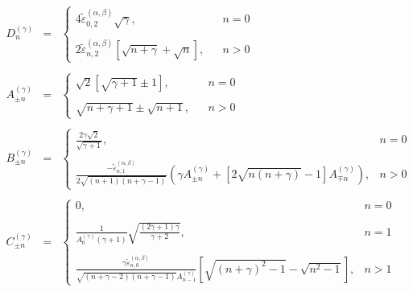 \[ \begin{array}{lll}
     D_n^{(\gamma)} & = & \left\{ \begin{array}{lll}
       4 \tilde{\varepsilon}_{0, 2}^{(\alpha, \beta)} \sqrt{\gamma}, &  & n =
       0\\
       &  & \\
       2 \tilde{\varepsilon}_{n, 2}^{(\alpha, \beta)} \left[ \sqrt{n + \gamma}
       + \sqrt{n} \right], &  & n > 0
     \end{array} \right.\\
     &  & \\
     A_{\pm n}^{(\gamma)} & = & \left\{ \begin{array}{lll}
       \sqrt{2} \left[ \sqrt{\gamma + 1} \pm 1 \right], &  & n = 0\\
       &  & \\
       \sqrt{n + \gamma + 1} \pm \sqrt{n + 1}, &  & n > 0
     \end{array} \right.\\
     &  & \\
     B_{\pm n}^{(\gamma)} & = & \left\{ \begin{array}{ll}
       \frac{2 \gamma \sqrt{2}}{\sqrt{\gamma + 1}}, & n = 0\\
       & \\
       \frac{- \tilde{\varepsilon}_{n, 1}^{(\alpha, \beta)}}{2 \sqrt{(n + 1)
       (n + \gamma - 1)}}  \left( \gamma A_{\pm n}^{(\gamma)} + \left[ 2
       \sqrt{n (n + \gamma)} - 1 \right] A_{\mp n}^{(\gamma)} \right), & n > 0
     \end{array} \right.\\
     &  & \\
     C_{\pm n}^{(\gamma)} & = & \left\{ \begin{array}{ll}
       0, & n = 0\\
       & \\
       \frac{1}{A_0^{(\gamma)} (\gamma + 1)} \sqrt{\frac{(2 \gamma + 1)
       \gamma}{\gamma + 2}}, & n = 1\\
       & \\
       \frac{\gamma \tilde{\varepsilon}_{n, 0}^{(\alpha, \beta)}}{\sqrt{(n +
       \gamma - 2) (n + \gamma - 1)} A_{n - 1}^{(\gamma)}} \left[ \sqrt{(n +
       \gamma)^2 - 1} - \sqrt{n^2 - 1} \right], & n > 1
     \end{array} \right.
   \end{array} \]
